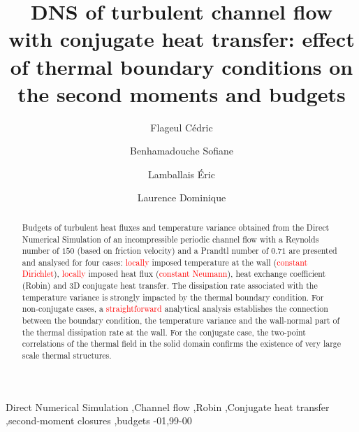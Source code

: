 \documentclass[review]{elsarticle}
\begin{document}
\begin{frontmatter}

\title{DNS of turbulent channel flow with conjugate heat transfer: effect of thermal boundary conditions on the second moments and budgets}


\author[mymainaddress]{Flageul C\'edric}

\author[mymainaddress]{Benhamadouche Sofiane}
\author[mysecondaryaddress]{Lamballais \'Eric}
\author[mymainaddress,mythirdaddress]{Laurence Dominique}

\address[mymainaddress]{EDF R\&D, Fluid Mechanics, Energy and Environment Dept. 6 Quai Wattier, 78401 Chatou, France}
\address[mysecondaryaddress]{Institute PPRIME, Department of Fluid Flow, Heat Transfer and Combustion, Universit\'e de Poitiers, CNRS, ENSMA, T\'el\'eport 2 - Bd. Marie et Pierre Curie B.P. 30179, 86962 Futuroscope Chasseneuil Cedex, France}
\address[mythirdaddress]{School of Mechanical, Aerospace and Civil Engineering, The University of Manchester, Sackville Street, Manchester M13 9PL, UK}

\begin{abstract}
Budgets of turbulent heat fluxes and temperature variance  obtained from the Direct Numerical Simulation of an incompressible periodic channel flow with a Reynolds number of $150$ (based on friction velocity) and a Prandtl number of $0.71$ are presented and analysed for four cases: \textcolor{red}{locally} imposed temperature at the wall (\textcolor{red}{constant Dirichlet}), \textcolor{red}{locally} imposed heat flux (\textcolor{red}{constant Neumann}), heat exchange coefficient (Robin) and 3D conjugate heat transfer. The dissipation rate associated with the temperature variance is strongly impacted by the thermal boundary condition. For non-conjugate cases, a \textcolor{red}{straightforward} analytical analysis establishes the connection between the boundary condition, the temperature variance and the wall-normal part of the thermal dissipation rate at the wall. For the conjugate case, the two-point correlations of the thermal field in the solid domain confirms the existence of very large scale thermal structures.
\end{abstract}

\begin{keyword}
Direct Numerical Simulation \sep Channel flow \sep Robin \sep Conjugate heat transfer \sep second-moment closures \sep budgets
-01\sep  99-00
\end{keyword}

\end{frontmatter}
\end{document}
